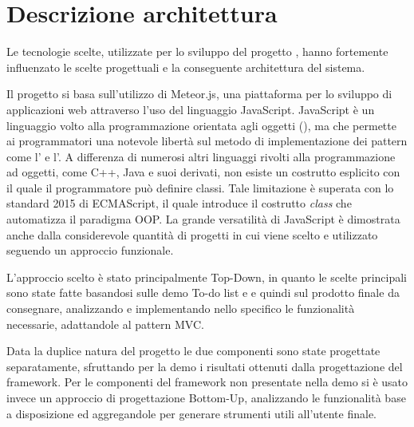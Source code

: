 \section{Descrizione architettura}\label{DescrizioneArchitettura}
Le tecnologie scelte, utilizzate per lo sviluppo del progetto \ProjectName{}, hanno fortemente influenzato le scelte progettuali e la conseguente architettura del sistema.

Il progetto si basa sull'utilizzo di Meteor.js, una piattaforma per lo sviluppo di applicazioni web attraverso l'uso del linguaggio JavaScript. JavaScript è un linguaggio volto alla programmazione orientata agli oggetti (), ma che permette ai programmatori una notevole libertà sul metodo di implementazione dei pattern come l' e l'. A differenza di numerosi altri linguaggi rivolti alla programmazione ad oggetti, come C++, Java e suoi derivati, non esiste un costrutto esplicito con il quale il programmatore può definire classi. Tale limitazione è superata con lo standard 2015 di ECMAScript, il quale introduce il costrutto \textit{class} che automatizza il paradigma OOP. La grande versatilità di JavaScript è dimostrata anche dalla considerevole quantità di progetti in cui viene scelto e utilizzato seguendo un approccio funzionale.

L'approccio scelto è stato principalmente Top-Down, in quanto le scelte principali sono state fatte basandosi sulle demo To-do list e \DemoName{} e quindi sul prodotto finale da consegnare, analizzando e implementando nello specifico le funzionalità necessarie, adattandole al pattern MVC.

Data la duplice natura del progetto le due componenti sono state progettate separatamente, sfruttando per la demo i risultati ottenuti dalla progettazione del framework. Per le componenti del framework non presentate nella demo si è usato invece un approccio di progettazione Bottom-Up, analizzando le funzionalità base a disposizione ed aggregandole per generare strumenti utili all'utente finale.
